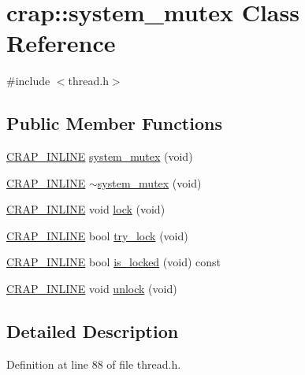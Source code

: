 \hypertarget{classcrap_1_1system__mutex}{\section{crap\+:\+:system\+\_\+mutex Class Reference}
\label{classcrap_1_1system__mutex}
}


{\ttfamily \#include $<$thread.\+h$>$}

\subsection*{Public Member Functions}
\begin{DoxyCompactItemize}
\item 
\hyperlink{config__x86_8h_a5a40526b8d842e7ff731509998bb0f1c}{C\+R\+A\+P\+\_\+\+I\+N\+L\+I\+N\+E} \hyperlink{classcrap_1_1system__mutex_a96bef354b4c766f2caa7128f60be49b5}{system\+\_\+mutex} (void)
\item 
\hyperlink{config__x86_8h_a5a40526b8d842e7ff731509998bb0f1c}{C\+R\+A\+P\+\_\+\+I\+N\+L\+I\+N\+E} \hyperlink{classcrap_1_1system__mutex_a997735dd47c3ec23045eaad4433598bb}{$\sim$system\+\_\+mutex} (void)
\item 
\hyperlink{config__x86_8h_a5a40526b8d842e7ff731509998bb0f1c}{C\+R\+A\+P\+\_\+\+I\+N\+L\+I\+N\+E} void \hyperlink{classcrap_1_1system__mutex_a9f1d7b173a9b232b8596b4be7ba3626c}{lock} (void)
\item 
\hyperlink{config__x86_8h_a5a40526b8d842e7ff731509998bb0f1c}{C\+R\+A\+P\+\_\+\+I\+N\+L\+I\+N\+E} bool \hyperlink{classcrap_1_1system__mutex_a593fac45648b23875db49bb00e7c4f8f}{try\+\_\+lock} (void)
\item 
\hyperlink{config__x86_8h_a5a40526b8d842e7ff731509998bb0f1c}{C\+R\+A\+P\+\_\+\+I\+N\+L\+I\+N\+E} bool \hyperlink{classcrap_1_1system__mutex_abe6dbd61297cd4e23be26d26d9febd00}{is\+\_\+locked} (void) const 
\item 
\hyperlink{config__x86_8h_a5a40526b8d842e7ff731509998bb0f1c}{C\+R\+A\+P\+\_\+\+I\+N\+L\+I\+N\+E} void \hyperlink{classcrap_1_1system__mutex_a47051096449f83f99980d2d2da16fc9d}{unlock} (void)
\end{DoxyCompactItemize}


\subsection{Detailed Description}


Definition at line 88 of file thread.\+h.



